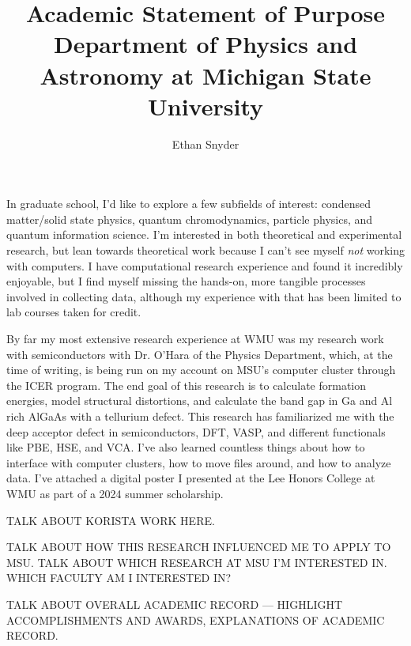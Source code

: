 \documentclass[11pt]{article}
\title{Academic Statement of Purpose\\
\large Department of Physics and Astronomy at Michigan State University}
\author{Ethan Snyder}
\begin{document}
\maketitle

In graduate school, I'd like to explore a few subfields of interest: condensed matter/solid state physics, quantum chromodynamics, particle physics, and quantum information science. I'm interested in both theoretical and experimental research, but lean towards theoretical work because I can't see myself \textit{not} working with computers. I have computational research experience and found it incredibly enjoyable, but I find myself missing the hands-on, more tangible processes involved in collecting data, although my experience with that has been limited to lab courses taken for credit.

By far my most extensive research experience at WMU was my research work with semiconductors with Dr. O'Hara of the Physics Department, which, at the time of writing, is being run on my account on MSU's computer cluster through the ICER program. The end goal of this research is to calculate formation energies, model structural distortions, and calculate the band gap in Ga and Al rich AlGaAs with a tellurium defect. This research has familiarized me with the deep acceptor defect in semiconductors, DFT, VASP, and different functionals like PBE, HSE, and VCA. I've also learned countless things about how to interface with computer clusters, how to move files around, and how to analyze data. I've attached a digital poster I presented at the Lee Honors College at WMU as part of a 2024 summer scholarship.

TALK ABOUT KORISTA WORK HERE.

TALK ABOUT HOW THIS RESEARCH INFLUENCED ME TO APPLY TO MSU. TALK ABOUT WHICH RESEARCH AT MSU I'M INTERESTED IN. WHICH FACULTY AM I INTERESTED IN?

TALK ABOUT OVERALL ACADEMIC RECORD --- HIGHLIGHT ACCOMPLISHMENTS AND AWARDS, EXPLANATIONS OF ACADEMIC RECORD.
\end{document}
